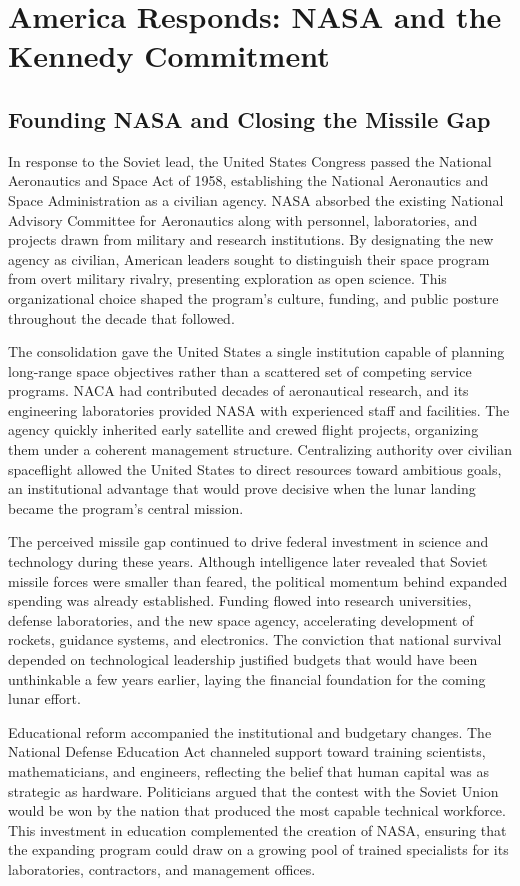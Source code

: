 \section{America Responds: NASA and the Kennedy Commitment}

\subsection{Founding NASA and Closing the Missile Gap}
In response to the Soviet lead, the United States Congress passed the National Aeronautics and Space Act of 1958, establishing the National Aeronautics and Space Administration as a civilian agency. NASA absorbed the existing National Advisory Committee for Aeronautics along with personnel, laboratories, and projects drawn from military and research institutions. By designating the new agency as civilian, American leaders sought to distinguish their space program from overt military rivalry, presenting exploration as open science. This organizational choice shaped the program's culture, funding, and public posture throughout the decade that followed.

The consolidation gave the United States a single institution capable of planning long-range space objectives rather than a scattered set of competing service programs. NACA had contributed decades of aeronautical research, and its engineering laboratories provided NASA with experienced staff and facilities. The agency quickly inherited early satellite and crewed flight projects, organizing them under a coherent management structure. Centralizing authority over civilian spaceflight allowed the United States to direct resources toward ambitious goals, an institutional advantage that would prove decisive when the lunar landing became the program's central mission.

The perceived missile gap continued to drive federal investment in science and technology during these years. Although intelligence later revealed that Soviet missile forces were smaller than feared, the political momentum behind expanded spending was already established. Funding flowed into research universities, defense laboratories, and the new space agency, accelerating development of rockets, guidance systems, and electronics. The conviction that national survival depended on technological leadership justified budgets that would have been unthinkable a few years earlier, laying the financial foundation for the coming lunar effort.

Educational reform accompanied the institutional and budgetary changes. The National Defense Education Act channeled support toward training scientists, mathematicians, and engineers, reflecting the belief that human capital was as strategic as hardware. Politicians argued that the contest with the Soviet Union would be won by the nation that produced the most capable technical workforce. This investment in education complemented the creation of NASA, ensuring that the expanding program could draw on a growing pool of trained specialists for its laboratories, contractors, and management offices.


